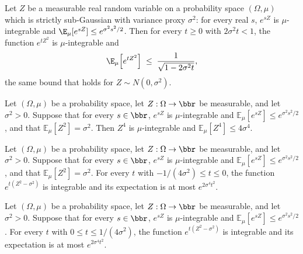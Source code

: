 \begin{lemma}
\label{integral_exp_mul_sq_le_of_subgaussian}
\leanok
{}
Let $Z$ be a measurable real random variable on a probability space $(\Omega, \mu)$
which is strictly sub-Gaussian with variance proxy $\sigma^2$: for every real $s$,
$e^{sZ}$ is $\mu$-integrable and $\E_\mu[e^{sZ}] \le e^{\sigma^2 s^2/2}$.  Then for every
$t \ge 0$ with $2\sigma^2 t < 1$, the function $e^{tZ^2}$ is $\mu$-integrable and
\[
  \E_\mu\!\left[e^{t Z^2}\right] \;\le\; \frac{1}{\sqrt{1 - 2\sigma^2 t}},
\]
the same bound that holds for $Z \sim N(0, \sigma^2)$.
\end{lemma}

\begin{lemma}
\label{integral_pow_four_le_of_subgaussian}
\leanok
{}
Let $(\Omega,\mu)$ be a probability space, let $Z:\Omega\to\bbr$ be measurable, and let
$\sigma^2>0$. Suppose that for every $s\in\bbr$, $e^{sZ}$ is $\mu$-integrable and
$\mathbb{E}_\mu[e^{sZ}]\le e^{\sigma^2s^2/2}$, and that $\mathbb{E}_\mu[Z^2]=\sigma^2$.
Then $Z^4$ is $\mu$-integrable and $\mathbb{E}_\mu[Z^4]\le4\sigma^4$.
\end{lemma}

\begin{lemma}
\label{mgf_centered_sq_le_of_nonpos}
\leanok
{}
Let $(\Omega,\mu)$ be a probability space, let $Z:\Omega\to\bbr$ be measurable, and let
$\sigma^2>0$. Suppose that for every $s\in\bbr$, $e^{sZ}$ is $\mu$-integrable and
$\mathbb{E}_\mu[e^{sZ}]\le e^{\sigma^2s^2/2}$, and that $\mathbb{E}_\mu[Z^2]=\sigma^2$.
For every $t$ with $-1/(4\sigma^2)\le t\le0$, the function $e^{t(Z^2-\sigma^2)}$ is
integrable and its expectation is at most $e^{2\sigma^4t^2}$.
\end{lemma}

\begin{lemma}
\label{mgf_centered_sq_le_of_nonneg}
\leanok
{}
Let $(\Omega,\mu)$ be a probability space, let $Z:\Omega\to\bbr$ be measurable, and let
$\sigma^2>0$. Suppose that for every $s\in\bbr$, $e^{sZ}$ is $\mu$-integrable and
$\mathbb{E}_\mu[e^{sZ}]\le e^{\sigma^2s^2/2}$. For every $t$ with $0\le
t\le1/(4\sigma^2)$, the function $e^{t(Z^2-\sigma^2)}$ is integrable and its expectation
is at most $e^{2\sigma^4t^2}$.
\end{lemma}

